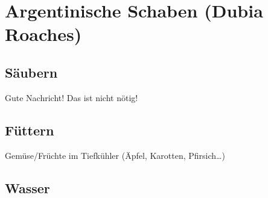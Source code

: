 \chapter{Argentinische Schaben (Dubia Roaches)}

\section{Säubern}
Gute Nachricht! Das ist nicht nötig!

\section{Füttern}
Gemüse/Früchte im Tiefkühler (Äpfel, Karotten, Pfirsich\ldots{})

\section{Wasser}
